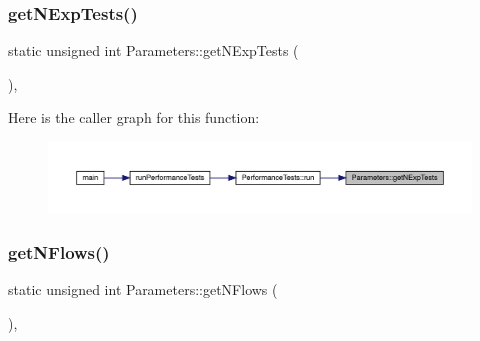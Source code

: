 \subsubsection{\texorpdfstring{getNExpTests()}{getNExpTests()}}
{\footnotesize\ttfamily static unsigned int Parameters\+::get\+N\+Exp\+Tests (\begin{DoxyParamCaption}{ }\end{DoxyParamCaption})\hspace{0.3cm}{\ttfamily [inline]}, {\ttfamily [static]}}

Here is the caller graph for this function\+:\nopagebreak
\begin{figure}[H]
\begin{center}
\leavevmode
\includegraphics[width=350pt]{class_parameters_abd70d1df3ee0109789496fc9d21c2aef_icgraph}
\end{center}
\end{figure}
\mbox{\label{class_parameters_aae314edb18d426571ab7b6df60da70aa}} 
\subsubsection{\texorpdfstring{getNFlows()}{getNFlows()}}
{\footnotesize\ttfamily static unsigned int Parameters\+::get\+N\+Flows (\begin{DoxyParamCaption}{ }\end{DoxyParamCaption})\hspace{0.3cm}{\ttfamily [inline]}, {\ttfamily [static]}}

